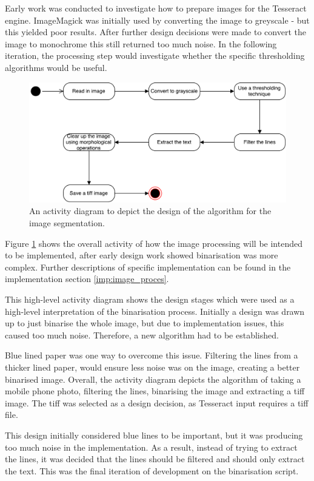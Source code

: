 Early work was conducted to investigate how to prepare images for the Tesseract engine. ImageMagick \cite{citeulike:14023816} was initially used by converting the image to greyscale - but this yielded poor results. After further design decisions were made to convert the image to monochrome this still returned too much noise. In the following iteration, the processing step would investigate whether the specific thresholding algorithms would be useful.
\begin{figure}[H]
  \centering
  \includegraphics[scale=0.5]{images/image_binarisation_activity.pdf}
  \caption{An activity diagram to depict the design of the algorithm for the image segmentation.}
  \label{fig:activity_binarise}
\end{figure}

Figure \ref{fig:activity_binarise} shows the overall activity of how the image processing will be intended to be implemented, after early design work showed binarisation was more complex. Further descriptions of specific implementation can be found in the implementation section \ref{imp:image_proces}.

This high-level activity diagram shows the design stages which were used as a  high-level interpretation of the binarisation process. Initially a design was drawn up to just binarise the whole image, but due to implementation issues, this caused too much noise. Therefore, a new algorithm had to be established.

Blue lined paper was one way to overcome this issue. Filtering the lines from a thicker lined paper, would ensure less noise was on the image, creating a better binarised image. Overall, the activity diagram depicts the algorithm of taking a mobile phone photo, filtering the lines, binarising the image and extracting a tiff image. The tiff was selected as a design decision, as Tesseract input requires a tiff file.

This design initially considered blue lines to be important, but it was producing too much noise in the implementation. As a result, instead of trying to extract the lines, it was decided that the lines should be filtered and should only extract the text. This was the final iteration of development on the binarisation script.


